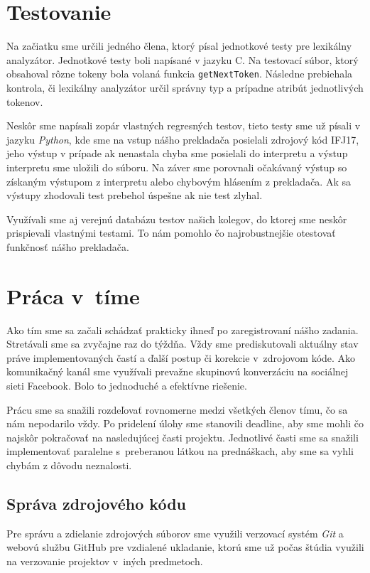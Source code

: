 \documentclass{article}
\begin{document}
    \section{Testovanie}
    Na začiatku sme určili jedného člena, ktorý písal jednotkové testy pre lexikálny analyzátor.
    Jednotkové testy boli napísané v jazyku C. Na testovací súbor, ktorý obsahoval rôzne tokeny bola volaná funkcia
    \texttt{getNextToken}. Následne prebiehala kontrola, či lexikálny analyzátor určil správny typ a prípadne atribút
    jednotlivých tokenov.
    
    Neskôr sme napísali zopár vlastných regresných testov, tieto testy sme už písali v jazyku \emph{Python}, kde
    sme na vstup nášho prekladača posielali zdrojový kód IFJ17, jeho výstup v prípade ak nenastala chyba sme posielali
    do interpretu a výstup interpretu sme uložili do súboru. Na záver sme porovnali očakávaný výstup so získaným výstupom
    z interpretu alebo chybovým hlásením z prekladača. Ak sa výstupy zhodovali test prebehol úspešne ak nie test zlyhal.
    
    Využívali sme aj verejnú databázu testov našich kolegov, do ktorej sme neskôr prispievali vlastnými testami. 
    To nám pomohlo čo najrobustnejšie otestovať funkčnosť nášho prekladača.
    
    \section{Práca v~tíme}
    Ako tím sme sa začali schádzať prakticky ihneď po zaregistrovaní nášho zadania. Stretávali sme sa 
    zvyčajne raz do týždňa. Vždy sme prediskutovali aktuálny stav práve implementovaných častí 
    a ďalší postup či korekcie v~zdrojovom kóde. Ako komunikačný kanál sme využívali prevažne 
    skupinovú konverzáciu na sociálnej sieti Facebook. Bolo to jednoduché a efektívne riešenie.

    Prácu sme sa snažili rozdeľovať rovnomerne medzi všetkých členov tímu, čo sa nám nepodarilo vždy. 
    Po pridelení úlohy sme stanovili deadline, aby sme mohli čo najskôr pokračovať na nasledujúcej časti projektu. 
    Jednotlivé časti sme sa snažili implementovať paralelne s~preberanou látkou na prednáškach, aby sme sa vyhli chybám z dôvodu neznalosti.
    

        \subsection{Správa zdrojového kódu}
        Pre správu a zdielanie zdrojových súborov sme využili verzovací systém \emph{Git} a webovú službu GitHub pre vzdialené ukladanie, ktorú sme už počas štúdia využili na verzovanie projektov v~iných predmetoch.
        
\end{document}
